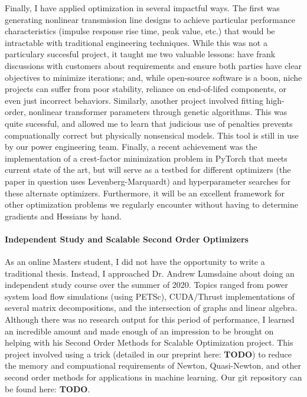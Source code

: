 \documentclass[letterpaper]{article}
\begin{document}
Finally, I have applied optimization in several impactful ways. The first was generating
nonlinear transmission line designs to achieve particular performance characteristics
(impulse response rise time, peak value, etc.) that would be intractable with traditional
engineering techniques. While this was not a particulary succesful project, it taught me two
valuable lessons: have frank discussions with customers about requirements and ensure
both parties have clear objectives to minimize iterations; and, while open-source
software is a boon, niche projects can suffer from poor stability, reliance on end-of-lifed
components, or even just incorrect behaviors. Similarly, another project involved
fitting high-order, nonlinear transformer parameters through genetic algorithms. This
was quite sucessful, and allowed me to learn that judicious use of penalties prevents
compuationally correct but physically nonsensical models. This tool is still in use
by our power engineering team. Finally, a recent achievement was the implementation of a
crest-factor minimization problem in PyTorch that meets current state of the art, but
will serve as a testbed for different optimizers (the paper in question uses
Levenberg-Marquardt) and hyperparameter searches for these alternate optimizers.
Furthermore, it will be an excellent framework for other optimization problems
we regularly encounter without having to determine gradients and Hessians by hand.

\paragraph{Independent Study and Scalable Second Order Optimizers}
As an online Masters student, I did not have the opportunity to write a traditional
thesis. Instead, I approached Dr. Andrew Lumsdaine about doing an independent
study course over the summer of 2020. Topics ranged from power system load flow
simulations (using PETSc), CUDA/Thrust implementations of several matrix
decompositions, and the intersection of graphs and linear algebra. Although there was
no research output for this period of performance, I learned an incredible amount
and made enough of an impression to be brought on helping with his Second Order Methods
for Scalable Optimization project. This project involved using a trick (detailed
in our preprint here: \textbf{TODO}) to reduce the memory and compuational requirements
of Newton, Quasi-Newton, and other second order methods for applications in machine
learning. Our git repository can be found here: \textbf{TODO}. 
\end{document}

